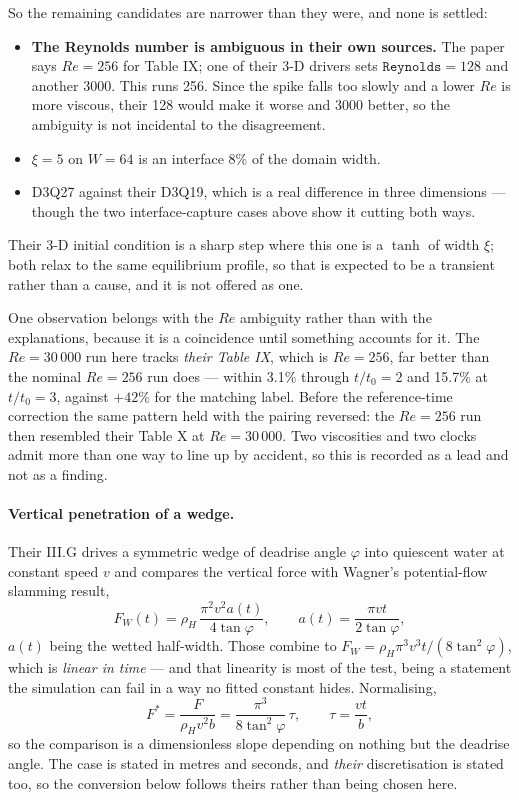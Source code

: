\documentclass[11pt,a4paper]{article}
\begin{document}
So the remaining candidates are narrower than they were, and none is settled:

\begin{itemize}
  \item \textbf{The Reynolds number is ambiguous in their own sources.} The
    paper says $Re=256$ for Table IX; one of their 3-D drivers sets
    $\mathtt{Reynolds}=128$ and another 3000. This runs 256. Since the spike
    falls too slowly and a lower $Re$ is more viscous, their 128 would make it
    worse and 3000 better, so the ambiguity is not incidental to the
    disagreement.
  \item $\xi=5$ on $W=64$ is an interface 8\% of the domain width.
  \item D3Q27 against their D3Q19, which is a real difference in three
    dimensions --- though the two interface-capture cases above show it cutting
    both ways.
\end{itemize}

Their 3-D initial condition is a sharp step where this one is a $\tanh$ of
width $\xi$; both relax to the same equilibrium profile, so that is expected to
be a transient rather than a cause, and it is not offered as one.

One observation belongs with the $Re$ ambiguity rather than with the
explanations, because it is a coincidence until something accounts for it. The
$Re=30\,000$ run here tracks \emph{their Table IX}, which is $Re=256$, far
better than the nominal $Re=256$ run does --- within 3.1\% through $t/t_0=2$
and 15.7\% at $t/t_0=3$, against $+42\%$ for the matching label. Before the
reference-time correction the same pattern held with the pairing reversed: the
$Re=256$ run then resembled their Table X at $Re=30\,000$. Two viscosities and
two clocks admit more than one way to line up by accident, so this is recorded
as a lead and not as a finding.

\paragraph{Vertical penetration of a wedge.} Their III.G drives a symmetric
wedge of deadrise angle $\varphi$ into quiescent water at constant speed $v$
and compares the vertical force with Wagner's potential-flow slamming result,
\[
  F_W(t) = \rho_H\,\frac{\pi^2 v^2 a(t)}{4\tan\varphi},
  \qquad a(t) = \frac{\pi v t}{2\tan\varphi},
\]
$a(t)$ being the wetted half-width. Those combine to
$F_W = \rho_H \pi^3 v^3 t/(8\tan^2\varphi)$, which is \emph{linear in time} ---
and that linearity is most of the test, being a statement the simulation can
fail in a way no fitted constant hides. Normalising,
\[
  F^* = \frac{F}{\rho_H v^2 b} = \frac{\pi^3}{8\tan^2\varphi}\,\tau,
  \qquad \tau = \frac{v t}{b},
\]
so the comparison is a dimensionless slope depending on nothing but the
deadrise angle. The case is stated in metres and seconds, and \emph{their}
discretisation is stated too, so the conversion below follows theirs rather
than being chosen here.
\end{document}
